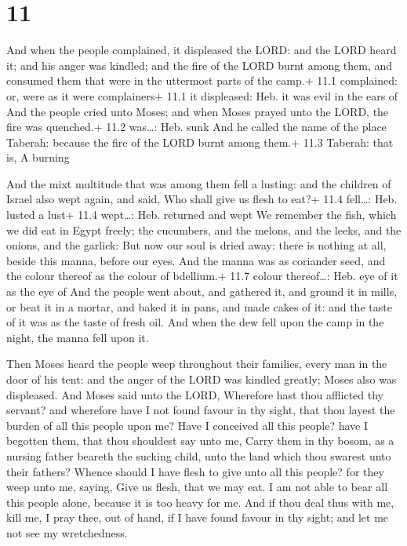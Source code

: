 \hypertarget{section-10}{%
\section{11}\label{section-10}}

 And when the people complained, it displeased the LORD: and
the LORD heard it; and his anger was kindled; and the fire of the LORD
burnt among them, and consumed them that were in the uttermost parts of
the camp.+ 11.1 complained: or, were as it were complainers+ 11.1 it
displeased: Heb. it was evil in the ears of  And the people
cried unto Moses; and when Moses prayed unto the LORD, the fire was
quenched.+ 11.2 was\ldots: Heb. sunk  And he called the name
of the place Taberah: because the fire of the LORD burnt among them.+
11.3 Taberah: that is, A burning

 And the mixt multitude that was among them fell a
lusting: and the children of Israel also wept again, and said, Who shall
give us flesh to eat?+ 11.4 fell\ldots: Heb. lusted a lust+ 11.4
wept\ldots: Heb. returned and wept  We remember the fish,
which we did eat in Egypt freely; the cucumbers, and the melons, and the
leeks, and the onions, and the garlick:  But now our soul is
dried away: there is nothing at all, beside this manna, before our eyes.
 And the manna was as coriander seed, and the colour thereof
as the colour of bdellium.+ 11.7 colour thereof\ldots: Heb. eye of it as
the eye of  And the people went about, and gathered it, and
ground it in mills, or beat it in a mortar, and baked it in pans, and
made cakes of it: and the taste of it was as the taste of fresh oil.
 And when the dew fell upon the camp in the night, the manna
fell upon it.

 Then Moses heard the people weep throughout their
families, every man in the door of his tent: and the anger of the LORD
was kindled greatly; Moses also was displeased.  And Moses
said unto the LORD, Wherefore hast thou afflicted thy servant? and
wherefore have I not found favour in thy sight, that thou layest the
burden of all this people upon me?  Have I conceived all
this people? have I begotten them, that thou shouldest say unto me,
Carry them in thy bosom, as a nursing father beareth the sucking child,
unto the land which thou swarest unto their fathers? 
Whence should I have flesh to give unto all this people? for they weep
unto me, saying, Give us flesh, that we may eat.  I am not
able to bear all this people alone, because it is too heavy for me.
 And if thou deal thus with me, kill me, I pray thee, out
of hand, if I have found favour in thy sight; and let me not see my
wretchedness.

